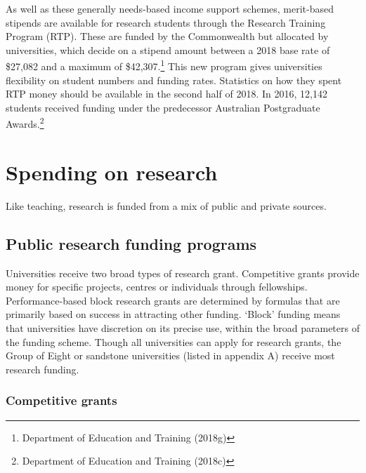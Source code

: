 \documentclass[]{book}
\begin{document}
As well as these generally needs-based income support schemes, merit-based stipends are available for research students through the Research Training Program (RTP). These are funded by the Commonwealth but allocated by universities, which decide on a stipend amount between a 2018 base rate of \$27,082 and a maximum of \$42,307.\footnote{Department of Education and Training (2018g)} This new program gives universities flexibility on student numbers and funding rates. Statistics on how they spent RTP money should be available in the second half of 2018. In 2016, 12,142 students received funding under the predecessor Australian Postgraduate Awards.\footnote{Department of Education and Training (2018c)}

\hypertarget{spending-on-research}{%
\section{Spending on research}\label{spending-on-research}}

Like teaching, research is funded from a mix of public and private sources.

\hypertarget{public-research-funding-programs}{%
\subsection{Public research funding programs}\label{public-research-funding-programs}}

Universities receive two broad types of research grant. Competitive grants provide money for specific projects, centres or individuals through fellowships. Performance-based block research grants are determined by formulas that are primarily based on success in attracting other funding. `Block' funding means that universities have discretion on its precise use, within the broad parameters of the funding scheme. Though all universities can apply for research grants, the Group of Eight or sandstone universities (listed in appendix A) receive most research funding.

\hypertarget{competitive-grants}{%
\subsubsection{Competitive grants}\label{competitive-grants}}
\end{document}
